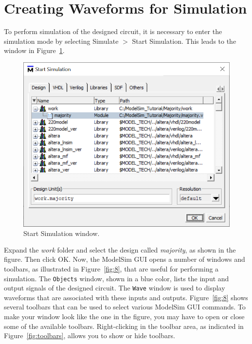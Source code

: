 \documentclass[11pt, twoside, pdftex]{article}
\begin{document}
\section{Creating Waveforms for Simulation}

To perform simulation of the designed circuit, it is necessary to enter the simulation mode
by selecting {\sf Simulate $>$ Start Simulation}. This leads to the window in Figure~\ref{fig:7}.

\begin{figure}[H]
   \begin{center}
      \includegraphics[scale=1.0]{figures/figure7.png}
   \caption{Start Simulation window.} 
	 \label{fig:7}
	 \end{center}
\end{figure}

Expand the {\it work} folder and select the design called {\it majority}, as shown in the
figure. Then click {\sf OK}. Now, the ModelSim GUI opens a number of windows and toolbars, 
as illustrated in Figure~\ref{fig:8}, that are useful for performing a simulation.  
The \texttt{Objects} window, shown in a blue color, lists the input and output signals 
of the designed circuit. The \texttt{Wave} window is used to display waveforms that are
associated with these inputs and outputs. Figure~\ref{fig:8} shows several toolbars 
that can be used to select various ModelSim GUI commands. To make your window look like 
the one in the figure, you may have to open or close some of the available toolbars. 
{\sf Right-clicking} in the toolbar area, as indicated in Figure~\ref{fig:toolbars}, 
allows you to show or hide toolbars.
\end{document}
